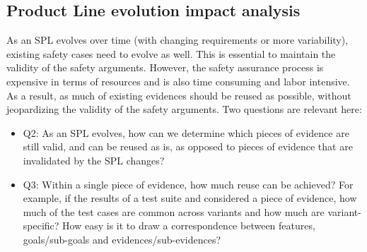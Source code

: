 \documentclass[11pt]{article}
\begin{document}
\subsection{Product Line evolution impact analysis}

As an SPL evolves over time (with changing requirements or more variability), existing safety cases need to evolve as well. This is essential to maintain the validity of the safety arguments. However, the safety assurance process is expensive in terms of resources and is also time consuming and labor intensive. As a result, as much of existing evidences should be reused as possible, without jeopardizing the validity of the safety arguments. Two questions are relevant here:

\begin{itemize}

\item Q2: As an SPL evolves, how can we determine which pieces of evidence are still valid, and can be reused as is, as opposed to pieces of evidence that are invalidated by the SPL changes?

\item Q3: Within a single piece of evidence, how much reuse can be achieved? For example, if the results of a test suite and considered a piece of evidence, how much of the test cases are common across variants and how much are variant-specific? How easy is it to draw a correspondence between features, goals/sub-goals and evidences/sub-evidences? 

\end{itemize}



\end{document}
